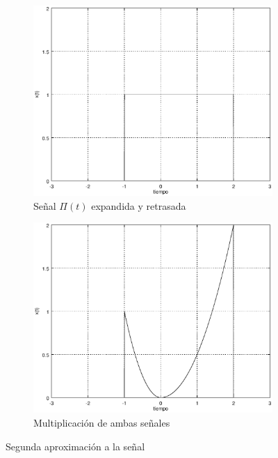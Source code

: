 \documentclass[10pt,a4paper]{report}
\begin{document}
\begin{figure}[H]
  \begin{center}
    
    \begin{subfigure}{0.5\textwidth}
      \begin{center}
        \includegraphics[width=1\linewidth]{Ejercicio1/Aproximacion2a}
        \caption{Señal $\Pi(t)$ expandida y retrasada}
        \label{fig:Aprox2a}
      \end{center}
    \end{subfigure}%
    \begin{subfigure}{0.5\textwidth}
      \begin{center}
        \includegraphics[width=1\linewidth]{Ejercicio1/Aproximacion2b}
        \caption{Multiplicación de ambas señales}
        \label{fig:Aprox2b}
      \end{center}
    \end{subfigure}
    
    \caption{Segunda aproximación a la señal}
    \label{fig:Aprox2}
  \end{center}
\end{figure}
\end{document}
